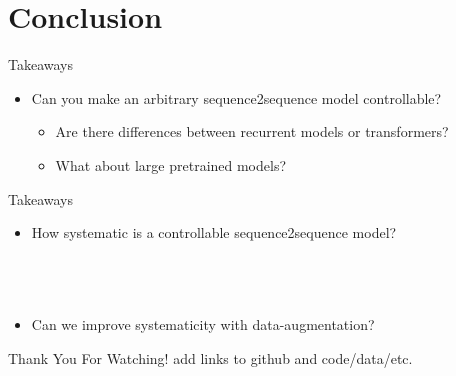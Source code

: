 \section{Conclusion}

\begin{frame}{Takeaways}
\begin{itemize}
\item Can you make an arbitrary sequence2sequence model controllable? 
    \\ 

    \begin{itemize}
\item Are there differences between recurrent models or
    transformers? \\ 
\item What about large pretrained models? \\ 
    \end{itemize}
\end{itemize}
\end{frame}

\begin{frame}{Takeaways}
\begin{itemize}
\item How systematic is a controllable sequence2sequence model? \\
    \\
    \\
    \\
\item Can we improve systematicity with data-augmentation?\\
\end{itemize}

\end{frame}

\begin{frame}{Thank You For Watching!}
add links to github and code/data/etc.
\end{frame}
